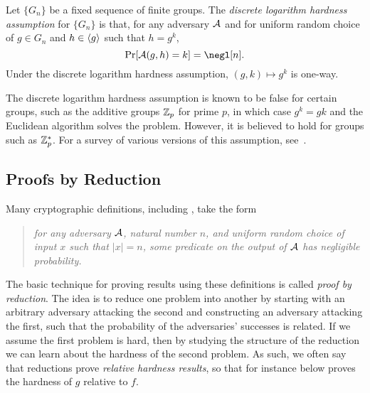 \begin{ex}
  Let $\{G_n\}$ be a fixed sequence of finite groups. The \emph{discrete logarithm hardness assumption}
  for $\{G_n\}$ is that, for any adversary $\mathcal{A}$ and for uniform random choice of
  $g\in G_n$ and $h\in\langle g\rangle$ such that $h = g^k$, \[
    \Pr[\cA(g,h) = k] = \negl[n].
  \]
  Under the discrete logarithm hardness assumption, $(g,k)\mapsto g^k$ is one-way.

  The discrete logarithm hardness assumption is known to be false for certain groups, such
  as the additive groups $\mathbb{Z}_p$ for prime $p$, in which case $g^k = gk$ and the
  Euclidean algorithm solves the problem. However, it is believed to hold for
  groups such as $\mathbb{Z}^*_p$. For a survey of various versions of this assumption,
  see~\cite{sadeghi-steinerr-2002}.
\end{ex}

\subsection{Proofs by Reduction}

Many cryptographic definitions, including ,
take the form \begin{quote}\emph{for any adversary $\mathcal{A}$, natural number $n$, and uniform
random choice of input $x$ such that $|x| = n$, some predicate on the output
of $\mathcal{A}$ has negligible probability.}\end{quote} The basic technique for proving results
using these definitions is called \emph{proof by reduction}. The idea is to
reduce one problem into another by starting with an arbitrary adversary
attacking the second and constructing an adversary attacking the first,
such that the probability of the adversaries' successes is related. If we assume
the first problem is hard, then by studying the structure of the reduction we
can learn about the hardness of the second problem. As such, we often say that
reductions prove \emph{relative hardness results}, so that for instance
below proves the hardness of $g$ relative to $f$.


